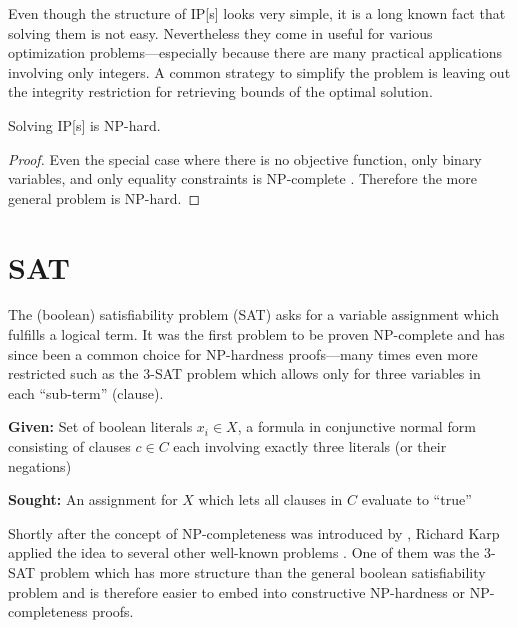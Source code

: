 Even though the structure of \gls{IP}[s] looks very simple, it is a
long known fact that solving them is not easy. Nevertheless they come
in useful for various optimization problems---especially because there
are many practical applications involving only integers. A common
strategy to simplify the problem is leaving out the integrity
restriction for retrieving bounds of the optimal solution.

\begin{theorem}
  Solving \gls{IP}[s] is NP-hard.
\end{theorem}

\begin{proof}
  Even the special case where there is no objective function, only
  binary variables, and only equality constraints is NP-complete
  \cite{karp_np_complete}. Therefore the more general problem is
  NP-hard.
\end{proof}

\section{SAT}
The (boolean) satisfiability problem (SAT) asks for a variable
assignment which fulfills a logical term. It was the first problem to
be proven NP-complete \cite{np_complete} and has since been a common
choice for NP-hardness proofs---many times even more restricted such
as the 3-SAT problem which allows only for three variables in each
``sub-term'' (clause).

\begin{problem}[3-SAT]
  \label{prob:3SAT}\hfill
  \begin{labeling}{\hspace{4em}}
    \item[\textbf{Given:}]
      Set of boolean literals \(x_i \in X\), a formula in conjunctive 
      normal form consisting of clauses \(c \in C\) each involving 
      exactly three literals (or their negations)
    \item[\textbf{Sought:}]
      An assignment for \(X\) which lets all clauses in \(C\) evaluate
      to ``true''
  \end{labeling}
\end{problem}

Shortly after the concept of NP-completeness was introduced by 
\cite{np_complete}, Richard Karp applied the idea to several other
well-known problems \cite{karp_np_complete}. One of them was the
3-SAT problem which has more structure than the general boolean
satisfiability problem and is therefore easier to embed into
constructive NP-hardness or NP-completeness proofs.

